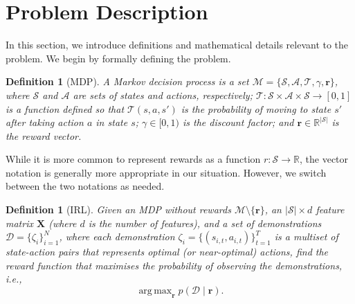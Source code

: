 \documentclass{mpaper}
\newtheorem{definition}[theorem]{Definition}
\DeclareMathOperator*{\argmax}{arg\,max}
\begin{document}
\section{Problem Description} \label{sec:problem}

In this section, we introduce definitions and mathematical details relevant to
the problem. We begin by formally defining the problem.

\begin{definition}[MDP]
  A \emph{Markov decision process} is a set $\mathcal{M} = \{ \mathcal{S},
  \mathcal{A}, \mathcal{T}, \gamma, \mathbf{r} \}$, where $\mathcal{S}$ and
  $\mathcal{A}$ are sets of states and actions, respectively; $\mathcal{T} :
  \mathcal{S} \times \mathcal{A} \times \mathcal{S} \to [0, 1]$ is a function
  defined so that $\mathcal{T}(s, a, s')$ is the probability of moving to state
  $s'$ after taking action $a$ in state $s$; $\gamma \in [0, 1)$ is the discount
  factor; and $\mathbf{r} \in \mathbb{R}^{|\mathcal{S}|}$ is the reward
  vector.
\end{definition}

While it is more common to represent rewards as a function $r : \mathcal{S} \to
\mathbb{R}$, the vector notation is generally more appropriate in our situation.
However, we switch between the two notations as needed.

\begin{definition}[IRL]
  Given an MDP without rewards $\mathcal{M} \setminus \{ \mathbf{r} \}$, an
  $|\mathcal{S}| \times d$ feature matrix $\mathbf{X}$ (where $d$ is the number
  of features), and a set of \emph{demonstrations} $\mathcal{D} = \{\zeta_i
  \}_{i=1}^N$, where each demonstration $\zeta_i = \{ (s_{i,t}, a_{i,t})
  \}_{t=1}^T$ is a multiset of state-action pairs that represents optimal (or
  near-optimal) actions, find the reward function that maximises the probability
  of observing the demonstrations, i.e.,
  \[
    \argmax_{\mathbf{r}} p(\mathcal{D} \mid \mathbf{r}).
  \]
\end{definition}
\end{document}
